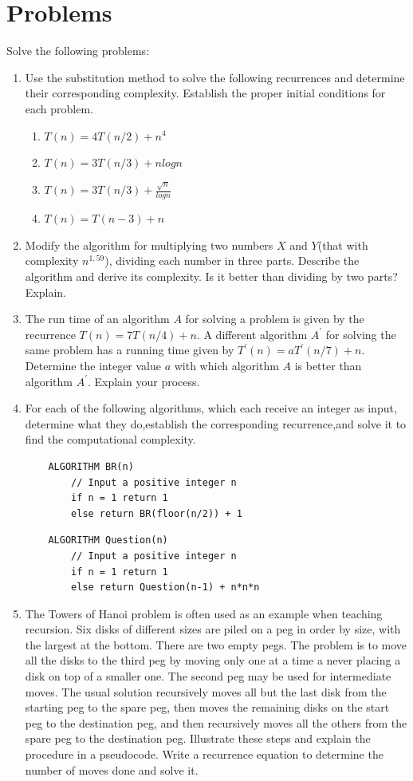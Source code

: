 \documentclass{article}
\begin{document}
\section{Problems}
Solve the following problems:
\begin{enumerate}
    \item Use  the  substitution  method  to  solve  the  following  recurrences  and  determine  their  corresponding complexity. Establish the proper initial conditions for each problem.
    \begin{enumerate}
        \item $T(n) = 4T(n/2) +n^4$
        \item $T(n) = 3T(n/3) + nlogn$
        \item $T(n) = 3T(n/3) + \frac{\sqrt{n}}{logn}$
        \item $T(n) = T(n - 3) +n$
    \end{enumerate}
    \item  Modify the algorithm for multiplying two numbers $X$ and $Y$(that with complexity $n^{1,59}$), dividing each number in three parts. Describe the algorithm and derive its complexity. Is it better than dividing by two parts? Explain.
    \item The run time of an algorithm $A$ for solving a problem is given by the recurrence $T(n) = 7T(n/4) + n.$ A different algorithm $A^{\prime}$ for solving the same problem has a running time given by $T^{\prime}(n) =aT^{\prime}(n/7) +n$. Determine  the  integer  value $a$ with  which  algorithm $A$ is  better  than  algorithm $A^{\prime}$.  Explain  your process.
    \item For each of the following algorithms, which each receive an integer as input, determine what they do,establish the corresponding recurrence,and solve it to find the computational complexity.
    \begin{lstlisting}
    ALGORITHM BR(n)
        // Input a positive integer n
        if n = 1 return 1
        else return BR(floor(n/2)) + 1
    \end{lstlisting}

    \begin{lstlisting}
    ALGORITHM Question(n)
        // Input a positive integer n
        if n = 1 return 1
        else return Question(n-1) + n*n*n
    \end{lstlisting}

    \item The Towers of Hanoi problem is often used as an example when teaching recursion. Six disks of different sizes are piled on a peg in order by size, with the largest at the bottom. There are two empty pegs. The problem is to move all the disks to the third peg by moving only one at a time a never placing a disk on top of a smaller one. The second peg may be used for intermediate moves. The usual solution recursively moves all but the last disk from the starting peg to the spare peg, then moves the remaining disks on the start peg to the destination peg, and then recursively moves all the others from the spare peg to the destination peg. Illustrate these steps and explain the procedure in a pseudocode. Write a recurrence equation to determine the number of moves done and solve it.
\end{enumerate}
\end{document}
